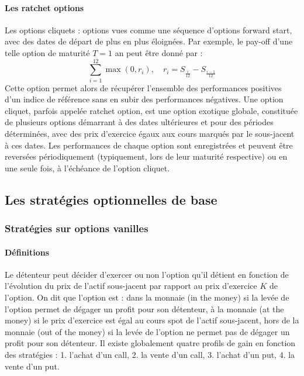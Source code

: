 \documentclass[a4paper, 12pt]{report}
\begin{document}
\paragraph{Les ratchet options}

Les options cliquets : options vues comme une séquence d’options forward start, avec des dates de départ de plus en plus éloignées. Par exemple, le pay-off d’une telle option de maturité \( T = 1 \) an peut être donné par :
\[
\sum_{i=1}^{12} \max(0, r_i), \quad r_i = S_{\frac{i}{12}} - S_{\frac{i-1}{12}} 
\]
Cette option permet alors de récupérer l’ensemble des performances positives d’un indice de référence sans en subir des performances négatives. Une option cliquet, parfois appelée ratchet option, est une option exotique globale, constituée de plusieurs options démarrant à des dates ultérieures et pour des périodes déterminées, avec des prix d’exercice égaux aux cours marqués par le sous-jacent à ces dates. Les performances de chaque option sont enregistrées et peuvent être reversées périodiquement (typiquement, lors de leur maturité respective) ou en une seule fois, à l’échéance de l’option cliquet.

\subsection{Les stratégies optionnelles de base}

\subsubsection{Stratégies sur options vanilles}

\paragraph{Définitions}

Le détenteur peut décider d’exercer ou non l’option qu’il détient en fonction de l’évolution du prix de l’actif sous-jacent par rapport au prix d’exercice \( K \) de l’option. On dit que l’option est : dans la monnaie (in the money) si la levée de l’option permet de dégager un profit pour son détenteur, à la monnaie (at the money) si le prix d’exercice est égal au cours spot de l’actif sous-jacent, hors de la monnaie (out of the money) si la levée de l’option ne permet pas de dégager un profit pour son détenteur. Il existe globalement quatre profils de gain en fonction des stratégies : 1. l’achat d’un call, 2. la vente d’un call, 3. l’achat d’un put, 4. la vente d’un put.
\end{document}
